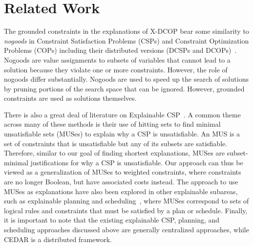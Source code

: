 \section{Related Work}
The grounded constraints in the explanations of X-DCOP bear some similarity to \emph{nogoods} in Constraint Satisfaction Problems (CSPs) and Constraint Optimization Problems (COPs) including their distributed versions (DCSPs and DCOPs)~\cite{schiex:94,Yokoo00,SilaghiY09}. Nogoods are value assignments to subsets of variables that cannot lead to a solution because they violate one or more constraints. However, the role of nogoods differ substantially. Nogoods are used to speed up the search of solutions by pruning portions of the search space that can be ignored. However, grounded constraints are used as solutions themselves.

There is also a great deal of literature on Explainable CSP~\cite{liffiton2008algorithms,laborie14,GuptaGO21}. A common theme across many of these methods is their use of hitting sets to find minimal unsatisfiable sets (MUSes) to explain why a CSP is unsatisfiable. An MUS is a set of constraints that is unsatisfiable but any of its subsets are satisfiable. Therefore, similar to our goal of finding shortest explanations, MUSes are subset-minimal justifications for why a CSP is unsatisfiable. Our approach can thus be viewed as a generalization of MUSes to weighted constraints, where constraints are no longer Boolean, but have associated costs instead. The approach to use MUSes as explanations have also been explored in other explainable subareas, such as explainable planning and scheduling~\cite{vas21,vasileioua2023lasp}, where MUSes correspond to sets of logical rules and constraints that must be satisfied by a plan or schedule. Finally, it is important to note that the existing explainable CSP, planning, and scheduling approaches discussed above are generally centralized approaches, while CEDAR is a distributed framework.

